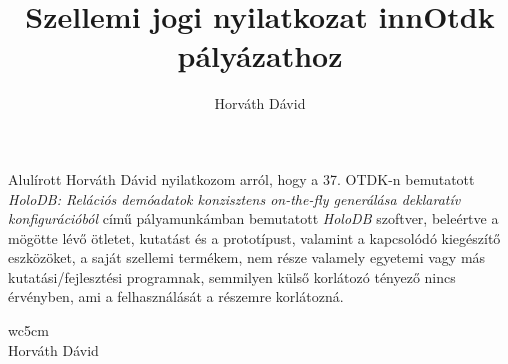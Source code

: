 \documentclass{article}
\title{Szellemi jogi nyilatkozat innOtdk pályázathoz}
\author{Horváth Dávid}
\begin{document}
\Large

\section*{\thetitle}

Alulírott Horváth Dávid nyilatkozom arról, hogy a 37. OTDK-n bemutatott \textit{HoloDB: Relációs demóadatok konzisztens on-the-fly generálása deklaratív konfigurációból} című pályamunkámban bemutatott \textit{HoloDB} szoftver, beleértve a mögötte lévő ötletet, kutatást és a prototípust, valamint a kapcsolódó kiegészítő eszközöket, a saját szellemi termékem, nem része valamely egyetemi vagy más kutatási/fejlesztési programnak, semmilyen külső korlátozó tényező nincs érvényben, ami a felhasználását a részemre korlátozná.

\vspace{1.5cm}

\begin{flushright}
\begin{tabular}{wc{5cm}}
\hrulefill \\
Horváth Dávid
\end{tabular}
\end{flushright}
\end{document}
